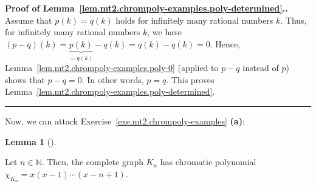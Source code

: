 \documentclass[numbers=enddot,12pt,final,onecolumn,notitlepage]{scrartcl}%
\theoremstyle{definition}
\newtheorem{lem}[theo]{Lemma}
\newenvironment{lemma}[1][]
{\begin{lem}[#1]\begin{leftbar}}
{\end{leftbar}\end{lem}}
\newenvironment{proof}[1][Proof]{\noindent\textbf{#1.} }{\ \rule{0.5em}{0.5em}}
\newcommand{\NN}{\mathbb{N}}
\newcommand{\tup}[1]{\left( #1 \right)}
\begin{document}
\begin{proof}[Proof of
Lemma~\ref{lem.mt2.chrompoly-examples.poly-determined}.]
Assume that $p \tup{k} = q \tup{k}$ holds for infinitely many
rational numbers $k$.
Thus, for infinitely many rational numbers $k$, we have
$\tup{p - q} \tup{k}
= \underbrace{p \tup{k}}_{= q \tup{k}} - q \tup{k}
= q \tup{k} - q \tup{k}
= 0$.
Hence, Lemma~\ref{lem.mt2.chrompoly-examples.poly-0}
(applied to $p - q$ instead of $p$) shows that $p - q = 0$.
In other words, $p = q$.
This proves Lemma~\ref{lem.mt2.chrompoly-examples.poly-determined}.
\end{proof}

Now, we can attack
Exercise~\ref{exe.mt2.chrompoly-examples} \textbf{(a)}:

\begin{lemma} \label{lem.mt2.chrompoly-examples.a}
Let $n \in \NN$.
Then, the complete graph $K_n$
has chromatic polynomial
$\chi_{K_n} = x \tup{x-1} \cdots \tup{x-n+1}$.
\end{lemma}
\end{document}
